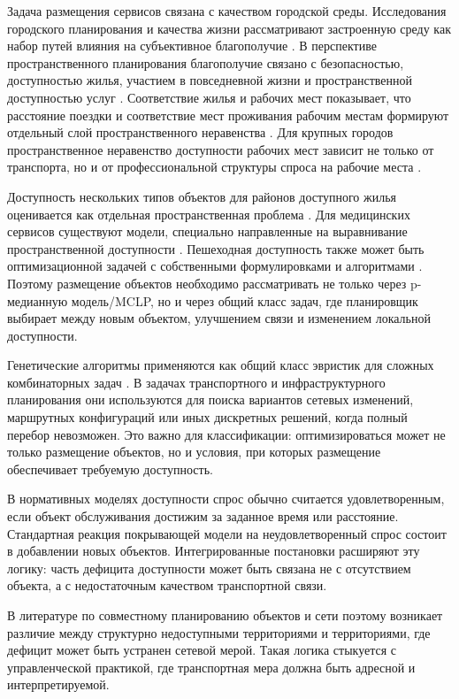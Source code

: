 Задача размещения сервисов связана с качеством городской среды. Исследования городского планирования и качества жизни рассматривают застроенную среду как набор путей влияния на субъективное благополучие \cite{mouratidis2021qualityLife}. В перспективе пространственного планирования благополучие связано с безопасностью, доступностью жилья, участием в повседневной жизни и пространственной доступностью услуг \cite{shekhar2019wellbeingSpatial}. Соответствие жилья и рабочих мест показывает, что расстояние поездки и соответствие мест проживания рабочим местам формируют отдельный слой пространственного неравенства \cite{blumenberg2023jobsHousing}. Для крупных городов пространственное неравенство доступности рабочих мест зависит не только от транспорта, но и от профессиональной структуры спроса на рабочие места \cite{xiao2021jobAccessibility}.

Доступность нескольких типов объектов для районов доступного жилья оценивается как отдельная пространственная проблема \cite{zhang2022affordableHousingAccessibility}. Для медицинских сервисов существуют модели, специально направленные на выравнивание пространственной доступности \cite{yu2023medicalAccessibility}. Пешеходная доступность также может быть оптимизационной задачей с собственными формулировками и алгоритмами \cite{huang2023walkability}. Поэтому размещение объектов необходимо рассматривать не только через p-медианную модель/MCLP, но и через общий класс задач, где планировщик выбирает между новым объектом, улучшением связи и изменением локальной доступности.

Генетические алгоритмы применяются как общий класс эвристик для сложных комбинаторных задач \cite{lambora2019geneticAlgorithm}. В задачах транспортного и инфраструктурного планирования они используются для поиска вариантов сетевых изменений, маршрутных конфигураций или иных дискретных решений, когда полный перебор невозможен. Это важно для классификации: оптимизироваться может не только размещение объектов, но и условия, при которых размещение обеспечивает требуемую доступность.

В нормативных моделях доступности спрос обычно считается удовлетворенным, если объект обслуживания достижим за заданное время или расстояние. Стандартная реакция покрывающей модели на неудовлетворенный спрос состоит в добавлении новых объектов. Интегрированные постановки расширяют эту логику: часть дефицита доступности может быть связана не с отсутствием объекта, а с недостаточным качеством транспортной связи.

В литературе по совместному планированию объектов и сети поэтому возникает различие между структурно недоступными территориями и территориями, где дефицит может быть устранен сетевой мерой. Такая логика стыкуется с управленческой практикой, где транспортная мера должна быть адресной и интерпретируемой.

